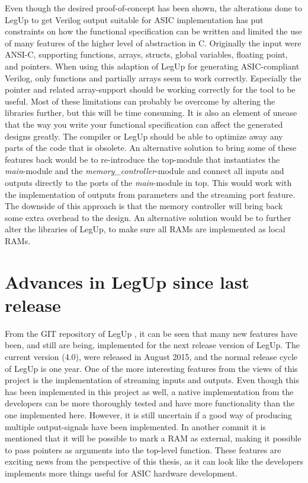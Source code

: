 Even though the desired proof-of-concept has been shown, the alterations done to LegUp to get Verilog output suitable for ASIC implementation has put constraints on how the functional specification can be written and limited the use of many features of the higher level of abstraction in C. Originally the input were ANSI-C, supporting functions, arrays, structs, global variables, floating point, and pointers. When using this adaption of LegUp for generating ASIC-compliant Verilog, only functions and partially arrays seem to work correctly. Especially the pointer and related array-support should be working correctly for the tool to be useful. Most of these limitations can probably be overcome by altering the libraries further, but this will be time consuming. It is also an element of unease that the way you write your functional specification can affect the generated designs greatly. The compiler or LegUp should be able to optimize away any parts of the code that is obsolete. An alternative solution to bring some of these features back would be to re-introduce the top-module that instantiates the \textit{main}-module and the \textit{memory\_controller}-module and connect all inputs and outputs directly to the ports of the \textit{main}-module in top. This would work with the implementation of outputs from parameters and the streaming port feature. The downside of this approach is that the memory controller will bring back some extra overhead to the design. An alternative solution would be to further alter the libraries of LegUp, to make sure all RAMs are implemented as local RAMs. 

\section{Advances in LegUp since last release}
From the GIT repository of LegUp \cite{legupgit}, it can be seen that many new features have been, and still are being, implemented for the next release version of LegUp. The current version (4.0), were released in August 2015, and the normal release cycle of LegUp is one year. One of the more interesting features from the views of this project is the implementation of streaming inputs and outputs. Even though this has been implemented in this project as well, a native implementation from the developers can be more thoroughly tested and have more functionality than the one implemented here. However, it is still uncertain if a good way of producing multiple output-signals have been implemented. In another commit it is mentioned that it will be possible to mark a RAM as external, making it possible to pass pointers as arguments into the top-level function. These features are exciting news from the perspective of this thesis, as it can look like the developers implements more things useful for ASIC hardware development.